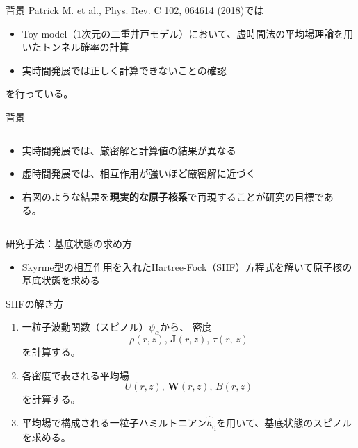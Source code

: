 \documentclass[12pt,aspectratio=169,xcolor=dvipsnames,table,dvipdfmx]{beamer}
\theoremstyle{definition}
\begin{document}
\begin{frame}{背景}
  Patrick M. et al., Phys. Rev. C 102, 064614 (2018)では
  \begin{itemize}
    \item Toy model（1次元の二重井戸モデル）において、虚時間法の平均場理論を用いたトンネル確率の計算
    \item 実時間発展では正しく計算できないことの確認
  \end{itemize}
  を行っている。
  \begin{center}
  \end{center}
\end{frame}

\begin{frame}{背景}
  \begin{columns}[t]
    \begin{column}{.5\textwidth}
      \begin{itemize}
        \item 実時間発展では、{\color{blue}厳密解}と{\color{orange}計算値}の結果が異なる
        \item 虚時間発展では、相互作用が強いほど{\color{blue}厳密解}に近づく
        \item 右図のような結果を\textbf{現実的な原子核系}で再現することが研究の目標である。
      \end{itemize}
    \end{column}
    \begin{column}{.5\textwidth}
    \end{column}
  \end{columns}
\end{frame}


\begin{frame}{研究手法：基底状態の求め方}
  \begin{itemize}
    \item Skyrme型の相互作用を入れたHartree-Fock（SHF）方程式を解いて原子核の基底状態を求める
  \end{itemize}
  \begin{block}{SHFの解き方}
    \begin{enumerate}
      \item 一粒子波動関数（スピノル）$\psi_{\alpha}$から、
      密度
      \begin{equation}
        \rho(r,z),\,\bm{J}(r,z),\,\tau(r,\,z)
      \end{equation}を計算する。
      \item 各密度で表される平均場
      \begin{equation}
        U(r,z),\,\bm{W}(r,z),\,B(r,z)
      \end{equation}
      を計算する。
      \item 平均場で構成される一粒子ハミルトニアン$\hat{h}_{\text{q}}$を用いて、基底状態のスピノルを求める。
    \end{enumerate}
  \end{block}
\end{frame}
\end{document}
